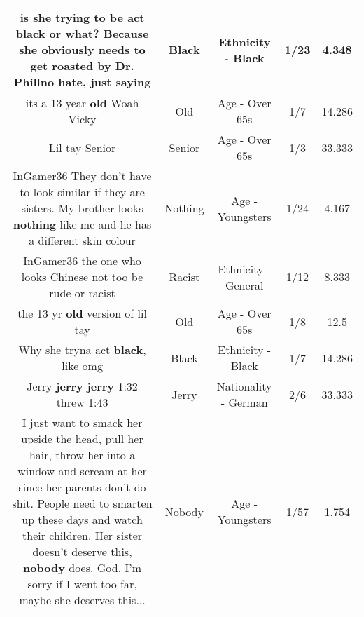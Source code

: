 \documentclass[11pt]{article}
\newlength\mylength
\begin{document}
\begin{center}
\begin{longtable}{|C{.65\mylength}|C{.30\mylength}|C{.12\mylength}|C{.12\mylength}|C{.12\mylength}|}
  \small is she trying to be act \textbf{black} or what? Because she obviously needs to get roasted by Dr. Phillno hate, just saying\normalsize   & Black & Ethnicity - Black & 1/23 & 4.348 \\  \hline
  \small its a 13 year \textbf{old} Woah Vicky\normalsize   & Old & Age - Over 65s & 1/7 & 14.286 \\  \hline
  \small Lil tay Senior\normalsize   & Senior & Age - Over 65s & 1/3 & 33.333 \\  \hline
  \small InGamer36 They don't have to look similar if they are sisters. My brother looks \textbf{nothing} like me and he has a different skin colour\normalsize   & Nothing & Age - Youngsters & 1/24 & 4.167 \\  \hline
  \small InGamer36 the one who looks Chinese not too be rude or racist\normalsize   & Racist & Ethnicity - General & 1/12 & 8.333 \\  \hline
  \small the 13 yr \textbf{old} version of lil tay\normalsize   & Old & Age - Over 65s & 1/8 & 12.5 \\  \hline
  \small Why she tryna act \textbf{black}, like omg\normalsize   & Black & Ethnicity - Black & 1/7 & 14.286 \\  \hline
  \small Jerry \textbf{jerry} \textbf{jerry} 1:32 threw 1:43\normalsize   & Jerry & Nationality - German & 2/6 & 33.333 \\  \hline
  \small I just want to smack her upside the head, pull her hair, throw her into a window and scream at her since her parents don't do shit. People need to smarten up these days and watch their children. Her sister doesn't deserve this, \textbf{nobody} does. God. I'm sorry if I went too far, maybe she deserves this...\normalsize   & Nobody & Age - Youngsters & 1/57 & 1.754 \\  \hline

\end{longtable}
\end{center}
\end{document}
